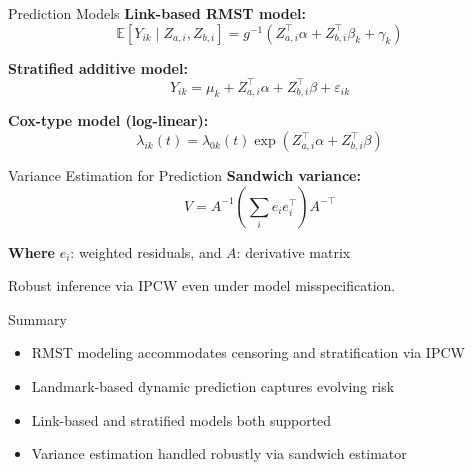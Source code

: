 \documentclass{beamer}
\begin{document}
\begin{frame}{Prediction Models}
\textbf{Link-based RMST model:}
\[
\mathbb{E}[Y_{ik} \mid Z_{a,i}, Z_{b,i}] = g^{-1}(Z_{a,i}^\top \alpha + Z_{b,i}^\top \beta_k + \gamma_k)
\]

\textbf{Stratified additive model:}
\[
Y_{ik} = \mu_k + Z_{a,i}^\top \alpha + Z_{b,i}^\top \beta + \varepsilon_{ik}
\]

\textbf{Cox-type model (log-linear):}
\[
\lambda_{ik}(t) = \lambda_{0k}(t) \exp(Z_{a,i}^\top \alpha + Z_{b,i}^\top \beta)
\]
\end{frame}

\begin{frame}{Variance Estimation for Prediction}
\textbf{Sandwich variance:}
\[
\hat{V} = A^{-1} \left( \sum_i e_i e_i^\top \right) A^{-\top}
\]

\textbf{Where } \( e_i \): weighted residuals, and \( A \): derivative matrix

\vspace{1em}
Robust inference via IPCW even under model misspecification.
\end{frame}

\begin{frame}{Summary}
\begin{itemize}
  \item RMST modeling accommodates censoring and stratification via IPCW
  \item Landmark-based dynamic prediction captures evolving risk
  \item Link-based and stratified models both supported
  \item Variance estimation handled robustly via sandwich estimator
\end{itemize}
\end{frame}
\end{document}
